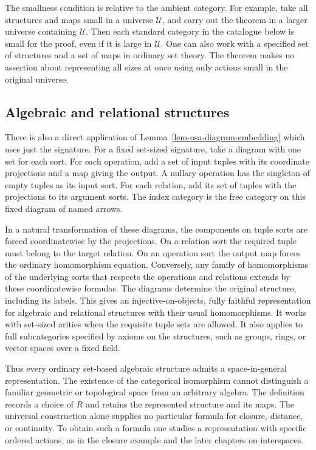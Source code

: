 The smallness condition is relative to the ambient category. For
example, take all structures and maps small in a universe $\mathcal U$,
and carry out the theorem in a larger universe containing $\mathcal U$.
Then each standard category in the catalogue below is small for the
proof, even if it is large in $\mathcal U$. One can also work with a
specified set of structures and a set of maps in ordinary set theory.
The theorem makes no assertion about representing all sizes at once
using only actions small in the original universe.

\subsection{Algebraic and relational structures}
\label{sec-osa-algebraic-structures}

There is also a direct application of
Lemma~\ref{lem-osa-diagram-embedding} which uses just the signature.
For a fixed set-sized signature, take a diagram with one set for each
sort. For each operation, add a set of input tuples with its coordinate
projections and a map giving the output. A nullary operation has the
singleton of empty tuples as its input sort. For each relation, add its
set of tuples with the projections to its argument sorts. The index
category is the free category on this fixed diagram of named arrows.

In a natural transformation of these diagrams, the components on tuple
sorts are forced coordinatewise by the projections. On a relation sort
the required tuple must belong to the target relation. On an operation
sort the output map forces the ordinary homomorphism equation. Conversely,
any family of homomorphisms of the underlying sorts that respects the
operations and relations extends by these coordinatewise formulas.
The diagrams determine the original structure, including its labels.
This gives an injective-on-objects, fully faithful representation for
algebraic and relational structures with their usual homomorphisms. It
works with set-sized arities when the requisite tuple sets are allowed.
It also applies to full subcategories specified by axioms on the
structures, such as groups, rings, or vector spaces over a fixed field.

Thus every ordinary set-based algebraic structure admits a
space-in-general representation. The existence of the categorical
isomorphism cannot distinguish a familiar geometric or topological space
from an arbitrary algebra. The definition records a choice of $R$ and
retains the represented structure and its maps. The universal construction
alone supplies no particular formula for closure, distance, or
continuity. To obtain such a formula one studies a representation with
specific ordered actions, as in the closure example and the later
chapters on interspaces.

